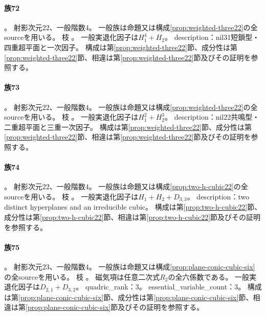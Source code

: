 \paragraph{族72}\label{catalogue:R4_NIL31_SHORT_QUADRUPLE_H_LINEAR_22}
。
射影次元$22$、一般階数$4$。
一般族は命題又は構成\ref{prop:weighted-three22}の全sourceを用いる。
枝 。
一般実退化因子は$H_{1}^{4}+H_{2}$。
description：nil31短鎖型・四重超平面と一次因子。
構成は第\ref{prop:weighted-three22}節、成分性は第\ref{prop:weighted-three22}節、相違は第\ref{prop:weighted-three22}節及びその証明を参照する。

\paragraph{族73}\label{catalogue:R4_NIL22_DOUBLE_H_TRIPLE_LINEAR_22}
。
射影次元$22$、一般階数$4$。
一般族は命題又は構成\ref{prop:weighted-three22}の全sourceを用いる。
枝 。
一般実退化因子は$H_{1}^{2}+H_{2}^{3}$。
description：nil22共鳴型・二重超平面と三重一次因子。
構成は第\ref{prop:weighted-three22}節、成分性は第\ref{prop:weighted-three22}節、相違は第\ref{prop:weighted-three22}節及びその証明を参照する。

\paragraph{族74}\label{catalogue:R4_TWO_HYPERPLANES_CUBIC_22}
。
射影次元$22$、一般階数$4$。
一般族は命題又は構成\ref{prop:two-h-cubic22}の全sourceを用いる。
枝 。
一般実退化因子は$H_{1}+H_{2}+D_{3,3}$。
description：two distinct hyperplanes and an irreducible cubic。
構成は第\ref{prop:two-h-cubic22}節、成分性は第\ref{prop:two-h-cubic22}節、相違は第\ref{prop:two-h-cubic22}節及びその証明を参照する。

\paragraph{族75}\label{catalogue:R4_PLANE_CONIC_CUBIC_CUSP_OUTSIDE_1_23}
。
射影次元$23$、一般階数$4$。
一般族は命題又は構成\ref{prop:plane-conic-cubic-six}の全sourceを用いる。
枝 。
磁気項は任意二次式$R_2$の全六係数である。
一般実退化因子は$D_{2,1}+D_{3,2}$。
quadric\_rank：3。
essential\_variable\_count：3。
構成は第\ref{prop:plane-conic-cubic-six}節、成分性は第\ref{prop:plane-conic-cubic-six}節、相違は第\ref{prop:plane-conic-cubic-six}節及びその証明を参照する。

